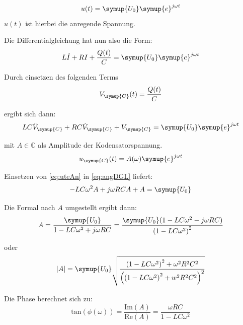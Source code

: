     \begin{equation}
        u(t)= \symup{U_0} \symup{e}^{j \omega t} \nonumber
    \end{equation}
    $u(t)$ ist hierbei die anregende Spannung.

    \noindent Die Differentialgleichung hat nun also die Form:
    \begin{equation}
        L \dot{I} + R I + \frac{Q(t)}{C} = \symup{U_0} \symup{e}^{j \omega t} \nonumber
    \end{equation}

    \noindent Durch einsetzen des folgenden Terms 
    \begin{equation}
        V_{\symup{C}} (t) = \frac{Q(t)}{C} \nonumber
    \end{equation}

    \noindent ergibt sich dann:
    \begin{equation}
        LC \ddot{V}_{\symup{C}} + RC \dot{V}_{\symup{C}} + V_{\symup{C}} = \symup{U_0} \symup{e}^{j \omega t} 
        \label{eq:angDGL}
    \end{equation}

    \noindent mit $A \in  \mathds{C}$ als Amplitude der Kodensatorspannung.
    \begin{equation}
        u_{\symup{C}} (t) = A(\omega) \symup{e}^{j \omega t} 
        \label{eq:uteAn}
    \end{equation}

    \noindent Einsetzen von \ref{eq:uteAn} in \ref{eq:angDGL} liefert:
    \begin{equation}
        -LC \omega^2 A + j\omega RC A +A = \symup{U_0} \nonumber
    \end{equation}

    \noindent Die Formal nach $A$ umgestellt ergibt dann:
    \begin{equation}
        A= \frac{\symup{U_0}}{1 - LC \omega^2 + j \omega RC} = \frac{ \symup{U_0}(1 -LC \omega^2 - j\omega RC)}{\left( 1- LC \omega^2 \right)^2} \nonumber
    \end{equation}
    
    \noindent oder
    \begin{equation}
        |A|= \symup{U_0} \sqrt{\frac{\left(1-LC\omega^2\right)^2 + \omega^2 R^2C^2}{\left( \left(1 -LC \omega^2\right)^2 +w^2R^2C^2 \right)^2}}
        \label{eq:betA}
    \end{equation}

    \noindent Die Phase berechnet sich zu:
    \begin{equation}
        \text{tan}(\phi (\omega)) = \frac{\text{Im}(A)}{\text{Re}(A)} = \frac{\omega RC}{1 - LC\omega^2} \nonumber
    \end{equation}

